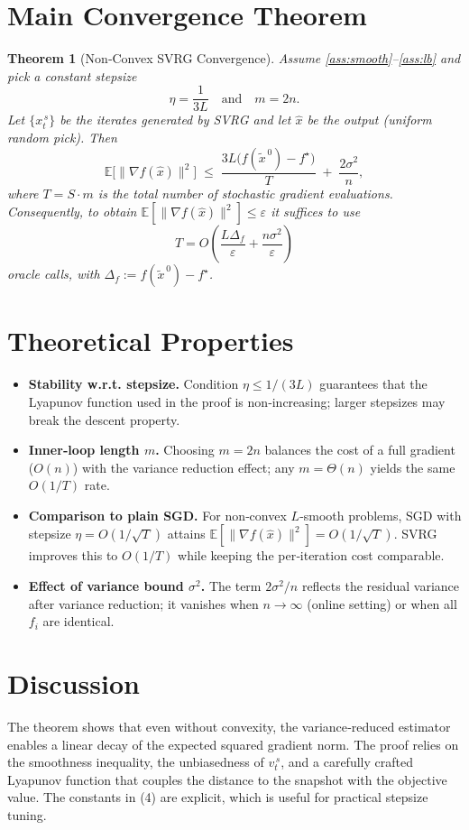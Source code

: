 \documentclass{article}
\newtheorem{theorem}{Theorem}
\newcommand{\EE}{\mathbb{E}}
\begin{document}
\section*{Main Convergence Theorem}
\begin{theorem}[Non‑Convex SVRG Convergence]\label{thm:svrg}
Assume \ref{ass:smooth}–\ref{ass:lb} and pick a constant stepsize
\[
\eta=\frac{1}{3L}\quad\text{and}\quad m=2n.
\]
Let $\{x_{t}^{\,s}\}$ be the iterates generated by SVRG and let $\hat{x}$ be the output (uniform random pick).  Then
\[
\EE\bigl[\|\nabla f(\hat{x})\|^{2}\bigr]
\;\le\;
\frac{3L\bigl(f(\tilde{x}^{\,0})-f^{\star}\bigr)}{T}
\;+\;
\frac{2\sigma^{2}}{n},
\tag{4}
\]
where $T=S\cdot m$ is the total number of stochastic gradient evaluations.
Consequently, to obtain $\EE[\|\nabla f(\hat{x})\|^{2}]\le\varepsilon$ it suffices to use
\[
T=O\!\left(\frac{L\Delta_f}{\varepsilon}+ \frac{n\sigma^{2}}{\varepsilon}\right)
\]
oracle calls, with $\Delta_f:=f(\tilde{x}^{\,0})-f^{\star}$.
\end{theorem}

\section*{Theoretical Properties}
\begin{itemize}
\item \textbf{Stability w.r.t. stepsize.} Condition $\eta\le 1/(3L)$ guarantees that the Lyapunov function used in the proof is non‑increasing; larger stepsizes may break the descent property.
\item \textbf{Inner‑loop length $m$.} Choosing $m=2n$ balances the cost of a full gradient ($O(n)$) with the variance reduction effect; any $m=\Theta(n)$ yields the same $O(1/T)$ rate.
\item \textbf{Comparison to plain SGD.} For non‑convex $L$‑smooth problems, SGD with stepsize $\eta=O(1/\sqrt{T})$ attains $\EE[\|\nabla f(\hat{x})\|^{2}]=O(1/\sqrt{T})$.  SVRG improves this to $O(1/T)$ while keeping the per‑iteration cost comparable.
\item \textbf{Effect of variance bound $\sigma^{2}$.} The term $2\sigma^{2}/n$ reflects the residual variance after variance reduction; it vanishes when $n\to\infty$ (online setting) or when all $f_i$ are identical.
\end{itemize}

\section*{Discussion}
The theorem shows that even without convexity, the variance‑reduced estimator enables a linear decay of the expected squared gradient norm.  The proof relies on the smoothness inequality, the unbiasedness of $v_t^{\,s}$, and a carefully crafted Lyapunov function that couples the distance to the snapshot with the objective value.  The constants in (4) are explicit, which is useful for practical stepsize tuning.
\end{document}
